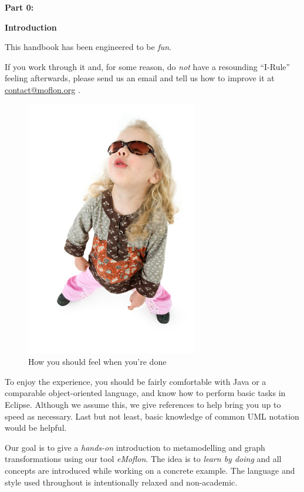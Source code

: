 \genHeader

{\bf \huge Part 0:}

\vspace{0.8cm}

{\bf \Huge Introduction }

\vspace{2cm}


This handbook has been engineered to be \emph{fun}.

If you work through it and, for some reason, do \emph{not} have a resounding \mbox{``I-Rule''} feeling afterwards, please send us an email and tell us how to
improve it at \href{mailto:contact@moflon.org}{contact@moflon.org} .

\begin{figure}[htp]
\begin{center}
	\includegraphics[height=0.45\textheight]{../introduction_images/i-rule}
	\caption{How you should feel when you're done}
	\label{i-rule}
\end{center}
\end{figure}
\break
 

To enjoy the experience, you should be fairly comfortable with Java or a comparable object-oriented language, and know how to perform basic tasks in Eclipse. 
Although we assume this, we give references to help bring you up to speed as necessary. Last but not least, basic knowledge of common UML notation would be
helpful.

Our goal is to give a \emph{hands-on} introduction to metamodelling and graph transformations using our tool \emph{eMoflon}. The idea is to \emph{learn by
doing} and all concepts are introduced while working on a concrete example. The language and style used throughout is intentionally relaxed and non-academic.


